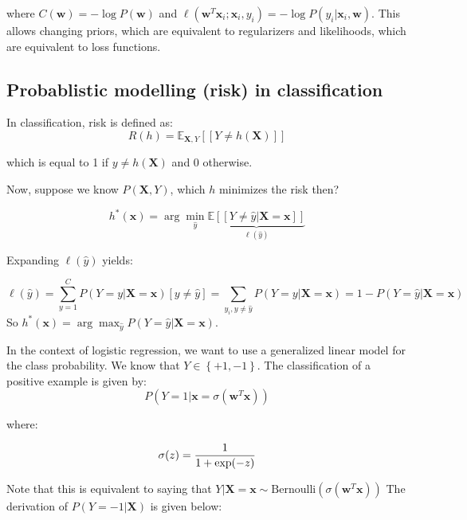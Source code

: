 \documentclass[a4paper,10pt,twoside]{article}
\begin{document}
where $C(\mathbf{w})=-\log P(\mathbf{w})$ and $\ell(\mathbf{w}^T\mathbf{x}_i;\mathbf{x}_i,y_i) = -\log P(y_i|\mathbf{x}_i, \mathbf{w})$. This allows changing priors, which are equivalent to regularizers and likelihoods, which are equivalent to loss functions.

\subsection{Probablistic modelling (risk) in classification}

In classification, risk is defined as:
\begin{equation*}
  R(h) = \mathbb{E}_{\mathbf{X},Y}[[Y\neq h(\mathbf{X})]]
\end{equation*}

which is equal to 1 if $y\neq h(\mathbf{X})$ and 0 otherwise.

Now, suppose we know $P(\mathbf{X},Y)$, which $h$ minimizes the risk then?

\begin{equation*}
  h^*(\mathbf{x}) = \arg\min_{\hat{y}}\underbrace{\mathbb{E}[[Y\neq \hat{y}|\mathbf{X}=\mathbf{x}]]}_{\ell(\hat{y})}
\end{equation*}

Expanding $\ell(\hat{y})$ yields:

\begin{equation*}
  \ell(\hat{y}) = \sum_{y=1}^C P(Y=y|\mathbf{X}=\mathbf{x})[y\neq \hat{y}] = \sum_{y_i, y\neq\hat{y}}P(Y=y|\mathbf{X}=\mathbf{x})=1-P(Y=\hat{y}|\mathbf{X}=\mathbf{x})
\end{equation*}
So $h^*(\mathbf{x}) =\arg\max_{\hat{y}} P(Y=\hat{y}|\mathbf{X}=\mathbf{x})$.

In the context of logistic regression, we want to use a generalized linear model for the class probability. We know that $Y\in\left\{+1,-1\right\}$. The classification of a positive example is given by:
\begin{equation*}
  P(Y=1|\mathbf{x} = \sigma(\mathbf{w}^T\mathbf{x}))
\end{equation*}

where:

\begin{equation*}
  \sigma(z) = {1\over 1+\exp(-z)}
\end{equation*}

Note that this is equivalent to saying that $Y|\mathbf{X}=\mathbf{x}\sim\mathrm{Bernoulli} {(\sigma(\mathbf{w}^T\mathbf{x}))}$
The derivation of $P(Y=-1|\mathbf{X})$ is given below:
\end{document}
